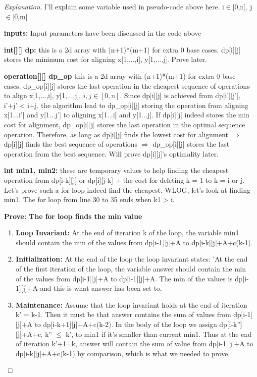 \documentclass[openany]{article}
\begin{document}
\begin{proof}[Explanation]{}
		\renewcommand{\qedsymbol}{} %
        I'll explain some variable used in pseudo-code above here. i$\in$[0,n], j$\in$[0,m]

        \textbf{inputs:} Input parameters have been discussed in the code above
        
        \textbf{int[][] dp:} this is a 2d array with (n+1)*(m+1) for extra 0 base cases. dp[i][j] stores the minimum cost for aligning x[1,...,i], y[1,...,j].  Prove later.
        
        \textbf{operation[][] dp\_op} this is a 2d array with (n+1)*(m+1) for extra 0 base cases. dp\_op[i][j] stores the last operation in the cheapest sequence of operations to align x[1,...,i], y[1,...,j], $i,j\in[0,n]$. Since dp[i][j] is achieved from dp[i'][j'], i'+j' < i+j, the algorithm lead to dp\_op[i][j] storing the operation from aligning x[1...i'] and y[1...j'] to aligning x[1...i] and y[1...j]. If dp[i][j] indeed stores the min cost for alignment, dp\_op[i][j] stores the last operation in the optimal sequence operation. Therefore, as long as dp[i][j] finds the lowest cost for alignment $\Rightarrow$ dp[i][j] finds the best sequence of operations $\Rightarrow$ dp\_op[i][j] stores the last operation from the best sequence. Will prove dp[i][j]'s optimality later.
        
        \textbf{int min1, min2:} these are temporary values to help finding the cheapest operation from dp[i-k][j] or dp[i][j-k] + the cost for deleting k = 1 to k = i or j. Let's prove such a for loop indeed find the cheapest. WLOG, let's look at finding min1. The for loop from line 30 to 35 ends when k1 > i.
        
        \textbf{Prove: The for loop finds the min value}
        \begin{enumerate}
            \item[] \textbf{Loop Invariant:} At the end of iteration  k  of the loop, the variable min1 should contain the min of the values from dp[i-1][j]+A to dp[i-k][j]+A+c(k-1).
        
        \item[] \textbf{Initialization:} At the end of the loop the loop invariant states: 'At the end of the first iteration of the loop, the variable answer should contain the min of the values from dp[i-1][j]+A to dp[i-1][j]+A. The min of the values is dp[i-1][j]+A and this is what answer has been set to.
        
        \item[] \textbf{Maintenance:} Assume that the loop invariant holds at the end of iteration k' = k-1. Then it must be that answer contains the sum of values from dp[i-1][j]+A to dp[i-k+1][j]+A+c(k-2). In the body of the loop we assign dp[i-k''][j]+A+c, k'' $\leq$ k', to min1 if it's smaller than current min1. Thus at the end of iteration  k'+1=k, answer will contain the sum of value from dp[i-1][j]+A to dp[i-k][j]+A+c(k-1) by comparison, which is what we needed to prove.
        

\end{enumerate}
\end{proof}
\end{document}
